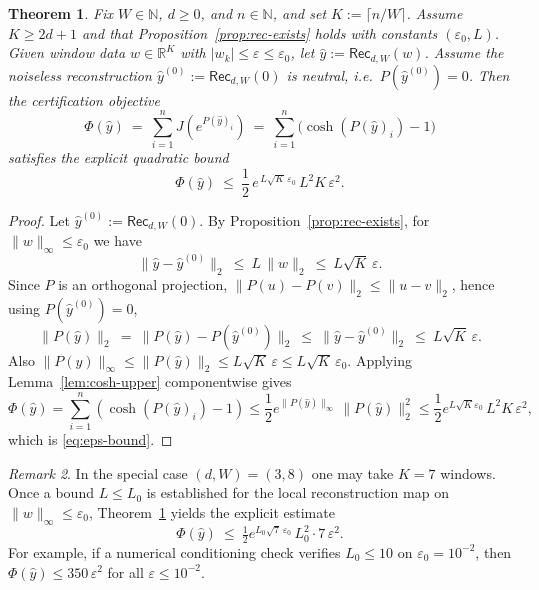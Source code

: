 \documentclass[11pt,reqno]{amsart}
\newtheorem{theorem}{Theorem}[section]
\theoremstyle{definition}
\theoremstyle{remark}
\newtheorem{remark}[theorem]{Remark} %
\newcommand{\R}{\mathbb{R}}
\newcommand{\1}{\mathbf{1}}
\providecommand{\N}{\mathbb{N}}
\begin{document}
\begin{theorem}\label{thm:eps-tolerant}
Fix $W\in\N$, $d\ge 0$, and $n\in\N$, and set $K:=\lceil n/W\rceil$.
Assume $K\ge 2d+1$ and that Proposition~\ref{prop:rec-exists} holds with constants $(\varepsilon_0,L)$.
Given window data $w\in\R^K$ with $|w_k|\le \varepsilon\le \varepsilon_0$, let $\hat y:=\mathsf{Rec}_{d,W}(w)$.
Assume the noiseless reconstruction $\hat y^{(0)}:=\mathsf{Rec}_{d,W}(0)$ is neutral, i.e.\ $P(\hat y^{(0)})=0$.
Then the certification objective
\[
\Phi(\hat y)\:=\ \sum_{i=1}^n J\!\left(e^{P(\hat y)_i}\right)\ =\ \sum_{i=1}^n \bigl(\cosh(P(\hat y)_i)-1\bigr)
\]
satisfies the explicit quadratic bound
\begin{equation}\label{eq:eps-bound}
\Phi(\hat y)\ \le\ \frac12\,e^{\,L\sqrt{K}\,\varepsilon_0}\,L^2K\,\varepsilon^2.
\end{equation}
\end{theorem}

\begin{proof}
Let $\hat y^{(0)}:=\mathsf{Rec}_{d,W}(0)$. By Proposition~\ref{prop:rec-exists}, for $\|w\|_\infty\le\varepsilon_0$ we have
\[
\|\hat y-\hat y^{(0)}\|_2\ \le\ L\,\|w\|_2 \ \le\ L\sqrt{K}\,\varepsilon.
\]
Since $P$ is an orthogonal projection, $\|P(u)-P(v)\|_2\le \|u-v\|_2$, hence using $P(\hat y^{(0)})=0$,
\[
\|P(\hat y)\|_2 \ =\ \|P(\hat y)-P(\hat y^{(0)})\|_2 \ \le\ \|\hat y-\hat y^{(0)}\|_2
\ \le\ L\sqrt{K}\,\varepsilon.
\]
Also $\|P(\hat y)\|_\infty\le \|P(\hat y)\|_2\le L\sqrt{K}\,\varepsilon \le L\sqrt{K}\,\varepsilon_0$.
Applying Lemma~\ref{lem:cosh-upper} componentwise gives
\[
\Phi(\hat y)=\sum_{i=1}^n(\cosh(P(\hat y)_i)-1)
\le \frac12 e^{\|P(\hat y)\|_\infty}\,\|P(\hat y)\|_2^2
\le \frac12 e^{L\sqrt{K}\varepsilon_0}\,L^2K\,\varepsilon^2,
\]
which is \eqref{eq:eps-bound}.
\end{proof}

\begin{remark}\label{rem:eps-numeric}
In the special case $(d,W)=(3,8)$ one may take $K=7$ windows.
Once a bound $L\le L_0$ is established for the local reconstruction map on $\|w\|_\infty\le \varepsilon_0$,
Theorem~\ref{thm:eps-tolerant} yields the explicit estimate
\[
\Phi(\hat y)\ \le\ \tfrac12 e^{L_0\sqrt{7}\,\varepsilon_0}\,L_0^2\cdot 7\,\varepsilon^2.
\]
For example, if a numerical conditioning check verifies $L_0\le 10$ on $\varepsilon_0=10^{-2}$,
then $\Phi(\hat y)\le 350\,\varepsilon^2$ for all $\varepsilon\le 10^{-2}$.
\end{remark}
\end{document}

